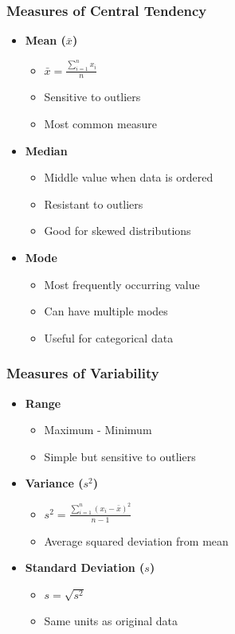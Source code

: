 \documentclass{beamer}
\begin{document}
\begin{frame}
\frametitle{Measures of Central Tendency}
\begin{itemize}
\item \textbf{Mean ($\bar{x}$)}
  \begin{itemize}
  \item $\bar{x} = \frac{\sum_{i=1}^{n} x_i}{n}$
  \item Sensitive to outliers
  \item Most common measure
  \end{itemize}
\item \textbf{Median}
  \begin{itemize}
  \item Middle value when data is ordered
  \item Resistant to outliers
  \item Good for skewed distributions
  \end{itemize}
\item \textbf{Mode}
  \begin{itemize}
  \item Most frequently occurring value
  \item Can have multiple modes
  \item Useful for categorical data
  \end{itemize}
\end{itemize}
\end{frame}

\begin{frame}
\frametitle{Measures of Variability}
\begin{itemize}
\item \textbf{Range}
  \begin{itemize}
  \item Maximum - Minimum
  \item Simple but sensitive to outliers
  \end{itemize}
\item \textbf{Variance ($s^2$)}
  \begin{itemize}
  \item $s^2 = \frac{\sum_{i=1}^{n} (x_i - \bar{x})^2}{n-1}$
  \item Average squared deviation from mean
  \end{itemize}
\item \textbf{Standard Deviation ($s$)}
  \begin{itemize}
  \item $s = \sqrt{s^2}$
  \item Same units as original data
  \end{itemize}
\end{itemize}
\end{frame}
\end{document}
